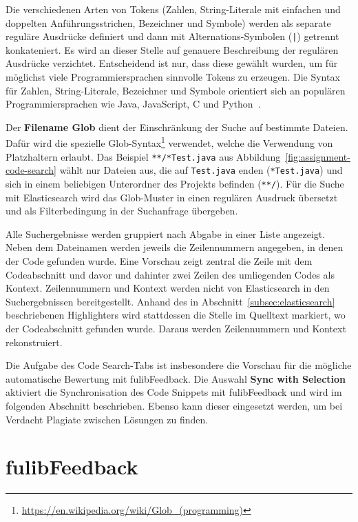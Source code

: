 Die verschiedenen Arten von Tokens (Zahlen, String-Literale mit einfachen und doppelten Anführungsstrichen, Bezeichner und Symbole) werden als separate reguläre Ausdrücke definiert und dann mit Alternations-Symbolen (\texttt{|}) getrennt konkateniert.
Es wird an dieser Stelle auf genauere Beschreibung der regulären Ausdrücke verzichtet.
Entscheidend ist nur, dass diese gewählt wurden, um für möglichst viele Programmiersprachen sinnvolle Tokens zu erzeugen.
Die Syntax für Zahlen, String-Literale, Bezeichner und Symbole orientiert sich an populären Programmiersprachen wie Java, JavaScript, C und Python~\cite{tiobe-index}.

Der \textbf{Filename Glob} dient der Einschränkung der Suche auf bestimmte Dateien.
Dafür wird die spezielle Glob-Syntax\footnote{
    \url{https://en.wikipedia.org/wiki/Glob_(programming)}
} verwendet, welche die Verwendung von Platzhaltern erlaubt.
Das Beispiel \texttt{**/*Test.java} aus Abbildung~\ref{fig:assignment-code-search} wählt nur Dateien aus, die auf \texttt{Test.java} enden (\texttt{*Test.java}) und sich in einem beliebigen Unterordner des Projekts befinden (\texttt{**/}).
Für die Suche mit Elasticsearch wird das Glob-Muster in einen regulären Ausdruck übersetzt und als Filterbedingung in der Suchanfrage übergeben.

Alle Suchergebnisse werden gruppiert nach Abgabe in einer Liste angezeigt.
Neben dem Dateinamen werden jeweils die Zeilennummern angegeben, in denen der Code gefunden wurde.
Eine Vorschau zeigt zentral die Zeile mit dem Codeabschnitt und davor und dahinter zwei Zeilen des umliegenden Codes als Kontext.
Zeilennummern und Kontext werden nicht von Elasticsearch in den Suchergebnissen bereitgestellt.
Anhand des in Abschnitt~\ref{subsec:elasticsearch} beschriebenen Highlighters wird stattdessen die Stelle im Quelltext markiert, wo der Codeabschnitt gefunden wurde.
Daraus werden Zeilennummern und Kontext rekonstruiert.

Die Aufgabe des Code Search-Tabs ist insbesondere die Vorschau für die mögliche automatische Bewertung mit fulibFeedback.
Die Auswahl \textbf{Sync with Selection} aktiviert die Synchronisation des Code Snippets mit fulibFeedback und wird im folgenden Abschnitt beschrieben.
Ebenso kann dieser eingesetzt werden, um bei Verdacht Plagiate zwischen Lösungen zu finden.

\section{fulibFeedback}\label{sec:fulibFeedback}

